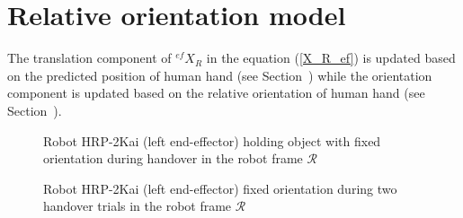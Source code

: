 
\section{Relative orientation model}\label{relOri}
The translation component of ${}^{ef}{X}_R $ in the equation (\ref{X_R_ef}) is updated based on the predicted position of human hand (see Section~) while the orientation component is updated based on the relative orientation of human hand (see Section~).

\begin{figure}[htpb]
	\caption{Robot HRP-2Kai (left end-effector) holding object with fixed orientation during handover in the robot frame $\mathcal{R}$}
	\label{fig:robot_lt_hand_obj}
\end{figure} 

\begin{figure}[htpb]
	\caption{Robot HRP-2Kai (left end-effector) fixed orientation during two handover trials in the robot frame $\mathcal{R}$}
	\label{fig:robot_lt_hand_2layers}
\end{figure} 

